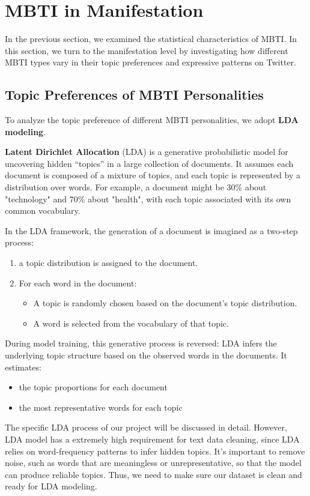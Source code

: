 \documentclass[12pt]{article}
\numberwithin{figure}{section}  %
\begin{document}
\section{MBTI in Manifestation} 
	In the previous section, we examined the statistical characteristics of
	MBTI. In this section, we turn to the manifestation level by investigating
	how different MBTI types vary in their topic preferences and expressive
	patterns on Twitter.	
	
	\subsection{Topic Preferences of MBTI Personalities}
	To analyze the topic preference of different MBTI personalities, we adopt
	\textbf{LDA modeling}.
	
	\textbf{Latent Dirichlet Allocation} (LDA) is a generative probabilistic model for
	uncovering hidden “topics” in a large collection of documents. It assumes
	each document is composed of a mixture of topics, and each topic is
	represented by a distribution over words. For example, a document might be
	30\% about "technology" and 70\% about "health", with each topic associated
	with its own common vocabulary.
	
	In the LDA framework, the generation of a document is imagined as a two-step
	process:
	\begin{enumerate}
		\item a topic distribution is assigned to the document.
		\item For each word in the document:
		\begin{itemize}
			\item A topic is randomly chosen based on the document’s topic distribution.
			\item A word is selected from the vocabulary of that topic.
		\end{itemize}
	\end{enumerate}
	During model training, this generative process is reversed: LDA infers the
	underlying topic structure based on the observed words in the documents. It
	estimates:
	\begin{itemize}
		\item the topic proportions for each document
		\item the most representative words for each topic
	\end{itemize}
	
	The specific LDA process of our project will be discussed in detail.
	However, LDA model has a extremely high requirement for text data cleaning,
	since LDA relies on word‐frequency patterns to infer
	hidden topics. It’s important to remove noise, such as words that are
	meaningless or unrepresentative, so that the model can produce reliable topics.
	Thus, we need to make sure our dataset is clean and ready
	for LDA modeling. 
\end{document}
